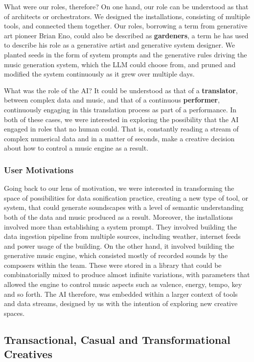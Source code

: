 What were our roles, therefore? On one hand, our role can be understood as that of architects or orchestrators. We designed the installations, consisting of multiple tools, and connected them together. Our roles, borrowing a term from generative art pioneer Brian Eno, could also be described as \textbf{gardeners}, a term he has used to describe his role as a generative artist and generative system designer. We planted seeds in the form of system prompts and the generative rules driving the music generation system, which the LLM could choose from, and pruned and modified the system continuously as it grew over multiple days. 

What was the role of the AI? It could be understood as that of a \textbf{translator}, between complex data and music, and that of a continuous \textbf{performer}, continuously engaging in this translation process as part of a performance. In both of these cases, we were interested in exploring the possibility that the AI engaged in roles that no human could. That is, constantly reading a stream of complex numerical data and in a matter of seconds, make a creative decision about how to control a music engine as a result. 

\subsubsection{User Motivations}

Going back to our lens of motivation, we were interested in transforming the space of possibilities for data sonification practice, creating a new type of tool, or system, that could generate soundscapes with a level of semantic understanding both of the data and music produced as a result. Moreover, the installations involved more than establishing a system prompt. They involved building the data ingestion pipeline from multiple sources, including weather, internet feeds and power usage of the building. On the other hand, it involved building the generative music engine, which consisted mostly of recorded sounds by the composers within the team. These were stored in a library that could be combinatorially mixed to produce almost infinite variations, with parameters that allowed the engine to control music aspects such as valence, energy, tempo, key and so forth. The AI therefore, was embedded within a larger context of tools and data streams, designed by us with the intention of exploring new creative spaces. 

\subsection{Transactional, Casual and Transformational Creatives}


